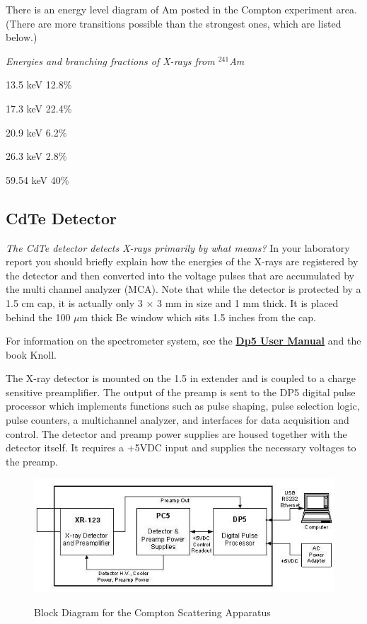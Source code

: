 \documentclass{../lab}
\begin{document}
There is an energy level diagram of Am posted in the Compton experiment area. (There are more transitions possible than the strongest ones, which are listed below.)

\emph{Energies and branching fractions of X-rays from $^{241}$Am}

13.5 keV 12.8\%

17.3 keV 22.4\%

20.9 keV 6.2\%

26.3 keV 2.8\%

59.54 keV 40\%

\subsection{CdTe Detector}

\emph{The CdTe detector detects X-rays primarily by what means?} In your laboratory report you should briefly explain how the energies of the X-rays are registered by the detector and then converted into the voltage pulses that are accumulated by the multi channel analyzer (MCA). Note that while the detector is protected by a 1.5 cm cap, it is actually only 3 $\times$ 3 mm in size and 1 mm thick. It is placed behind the 100 $\mu$m thick Be window which sits 1.5 inches from the cap.

For information on the spectrometer system, see the \href{http://experimentationlab.berkeley.edu/sites/default/files/images/DP5\_User\_Manual\_A1.pdf}{\textbf{Dp5 User Manual}} and the book Knoll.

The X-ray detector is mounted on the 1.5 in extender and is coupled to a charge sensitive preamplifier. The output of the preamp is sent to the DP5 digital pulse processor which implements functions such as pulse shaping, pulse selection logic, pulse counters, a multichannel analyzer, and interfaces for data acquisition and control. The detector and preamp power supplies are housed together with the detector itself. It requires a +5VDC input and supplies the necessary voltages to the preamp.

\begin{figure}
    \centering
    \href{http://experimentationlab.berkeley.edu/sites/default/files/images/COMimage01.jpg}{\includegraphics[width=0.7\linewidth]{images/COMimage01.jpg}}
    \caption{Block Diagram for the Compton Scattering Apparatus}
    \label{COMimage01}
\end{figure}
\end{document}
